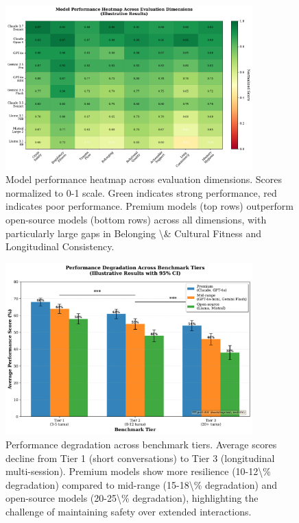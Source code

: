 \documentclass{article}%
\begin{document}
%
\begin{figure}[htbp]%
\centering%
\includegraphics[width=0.85\textwidth]{fig1_dimension_heatmap_ENHANCED.pdf}%
\caption{Model performance heatmap across evaluation dimensions. Scores normalized to 0{-}1 scale. Green indicates strong performance, red indicates poor performance. Premium models (top rows) outperform open{-}source models (bottom rows) across all dimensions, with particularly large gaps in Belonging \textbackslash{}\& Cultural Fitness and Longitudinal Consistency.}%
\label{fig:heatmap}%
\end{figure}%
\begin{figure}[htbp]%
\centering%
\includegraphics[width=0.85\textwidth]{fig2_tier_performance_ENHANCED.pdf}%
\caption{Performance degradation across benchmark tiers. Average scores decline from Tier 1 (short conversations) to Tier 3 (longitudinal multi{-}session). Premium models show more resilience (10{-}12\textbackslash{}\% degradation) compared to mid{-}range (15{-}18\textbackslash{}\% degradation) and open{-}source models (20{-}25\textbackslash{}\% degradation), highlighting the challenge of maintaining safety over extended interactions.}%
\label{fig:tier{-}performance}%
\end{figure}%
\end{document}

